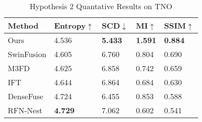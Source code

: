 \begin{table}[htbp]
    \centering
    \caption{Hypothesis 2 Quantative Results on TNO}
    \label{tab:ch5:met8}
    \begin{tabular}{|l|l|l|l|l|}
        \hline
        \textbf{Method} & \textbf{Entropy\cite{roberts2008assessment}$\uparrow$ } & \textbf{SCD\cite{aslantas2015new}$\downarrow$} & \textbf{MI\cite{qu2002information}$\uparrow$} & \textbf{SSIM\cite{ma2015perceptual}$\uparrow$} \\ \hline
        Ours            & 4.536                & \textbf{5.433}       & \textbf{1.591}           &\textbf{0.884}             \\ \hline
        SwinFusion\cite{ma2022swinfusion}           & 4.605                & 6.760       & 0.804           & 0.690             \\ \hline
        M3FD\cite{liu2022target}           & 4.625                & 6.858       & 0.742           & 0.659             \\ \hline
        IFT\cite{vs2022image}           & 4.644                & 6.864       & 0.684           & 0.630             \\ \hline
        DenseFuse\cite{li2019infrared}           & 4.724                & 6.455       & 0.853           & 0.588             \\ \hline
        RFN-Nest\cite{li2021rfn}            & \textbf{4.729}                & 7.062       & 0.602           & 0.541             \\ \hline
    \end{tabular}
\end{table}

